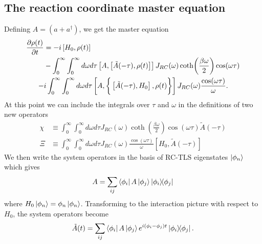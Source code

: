 \documentclass[]{article}
\begin{document}
\begin{itemize}
\begin{itemize}
\subsection{The reaction coordinate master equation}
Defining $A= (a + a^{\dagger})$, we get the master equation
\begin{align}
	\begin{split}
		\label{eq:ReactionMasterExpansion4}
		\pdv{\rho(t)}{t} &= -i\left[H_0, \rho(t)\right]\\
		&-\int_{0}^{\infty}\int_{0}^{\infty}d\omega d\tau 
		\left[A,\left[\tilde{A}(-\tau),\rho(t) \right]\right] J_{RC}(\omega) \coth(\frac{\beta \omega}{2})\cos(\omega \tau)\\ 
		-& i\int_{0}^{\infty}\int_{0}^{\infty}d\omega d\tau\left[A ,\biggr\lbrace\left[\tilde{A}(-\tau),H_0\right],\rho(t) \biggr\rbrace \right] J_{RC}(\omega) \frac{\cos(\omega \tau)}{\omega}.
	\end{split}
\end{align}
At this point we can include the integrals over $\tau$ and $\omega$ in the definitions of two new operators
\begin{align}
	\label{eq:NewRCOperators}
	\chi &\equiv \int_{0}^{\infty}\int_{0}^{\infty}d\omega d\tau  J_{RC}(\omega) \coth(\frac{\beta \omega}{2})\cos(\omega \tau) \tilde{A}(-\tau)\\
	\Xi &\equiv \int_{0}^{\infty}\int_{0}^{\infty}d\omega d\tau  J_{RC}(\omega) \frac{\cos(\omega\tau)}{\omega} \left[H_0, \tilde{A}(-\tau)\right]
\end{align}
We then write the system operators in the basis of RC-TLS eigenstates $\ket{\phi_n}$ which gives
\begin{equation}
A = \sum_{ij}\bra{\phi_i}A\ket{\phi_j} \dyad{\phi_i}{\phi_j}
\end{equation}
where $H_0\ket{\phi_n} = \phi_n\ket{\phi_n}$. Transforming to the interaction picture with respect to $H_0$, the system operators become
\begin{equation}
\tilde{A}(t) = \sum_{ij}\bra{\phi_i}A\ket{\phi_j} e^{i(\phi_i-\phi_j)t}\dyad{\phi_i}{\phi_j}.
\end{equation}


\end{itemize}
\end{itemize}
\end{document}

